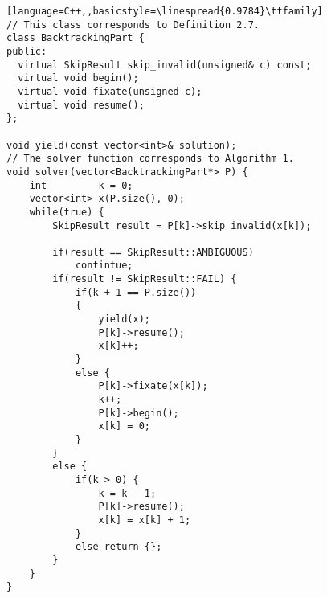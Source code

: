 \begin{lstlisting}[language=C++,,basicstyle=\linespread{0.9784}\ttfamily]
// This class corresponds to Definition 2.7.
class BacktrackingPart {
public:
  virtual SkipResult skip_invalid(unsigned& c) const;
  virtual void begin();
  virtual void fixate(unsigned c);
  virtual void resume();
};

void yield(const vector<int>& solution);
// The solver function corresponds to Algorithm 1.
void solver(vector<BacktrackingPart*> P) {
    int         k = 0;
    vector<int> x(P.size(), 0);
    while(true) {
        SkipResult result = P[k]->skip_invalid(x[k]);

        if(result == SkipResult::AMBIGUOUS)
            contintue;
        if(result != SkipResult::FAIL) {
            if(k + 1 == P.size())
            {
                yield(x);
                P[k]->resume();
                x[k]++;
            }
            else {
                P[k]->fixate(x[k]);
                k++;
                P[k]->begin();
                x[k] = 0;
            }
        }
        else {
            if(k > 0) {
                k = k - 1;
                P[k]->resume();
                x[k] = x[k] + 1;
            }
            else return {};
        }
    }
}
\end{lstlisting}
